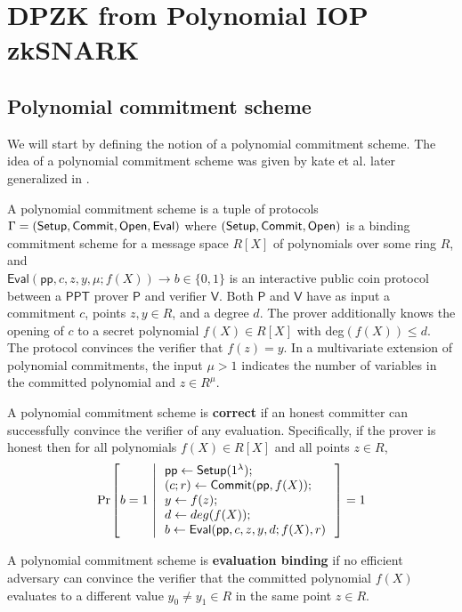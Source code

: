 \documentclass[runningheads]{llncs}
\def\commit{\mathsf{Commit}}
\def\open{\mathsf{Open}}
\def\eval{\mathsf{Eval}}
\def\pp{\mathsf{pp}}
\def\bitset{\{0,1\}}
\def\ppt{\mathsf{PPT}}
\def\prover{\mathsf{P}}
\def\verifier{\mathsf{V}}
\begin{document}
\section{DPZK from Polynomial IOP zkSNARK}
\subsection{Polynomial commitment scheme}
We will start by defining the notion of a polynomial commitment scheme. The idea of a polynomial commitment scheme was given by kate et al. \cite{KGZ10} later generalized in \cite{DARK19}.
\begin{definition}\label{defn:polycomm}
A polynomial commitment scheme is a tuple of protocols $\Gamma =(\setup, \commit, \open, \eval)$ where $(\setup, \commit, \open)$ is a binding commitment scheme for a message space $R[X]$ of polynomials over some ring $R$, and 
\\ $\eval(\pp, c, z, y, \mu; f(X)) \rightarrow b \in \bitset$ is an interactive public coin protocol between a $\ppt$ prover $\prover$ and verifier $\verifier$. Both $\prover$ and $\verifier$ have as input a commitment $c$, points $z,y\in R$, and a degree $d$. The prover additionally knows the opening of $c$ to a secret polynomial $f(X)\in R[X]$ with deg$(f(X))\leq d$. The protocol convinces the verifier that $f(z)=y$. In a multivariate extension of polynomial commitments, the input $\mu > 1$ indicates the number of variables in the committed polynomial and $z\in R^{\mu}$.  
\end{definition}

A polynomial commitment scheme is \textbf{correct} if an honest committer can successfully convince the verifier of any evaluation. Specifically, if the prover is honest then for all polynomials $f(X) \in R[X]$ and all points $z\in R$,
\begin{align*}
\condprob{b=1}{
	\begin{array}{l}
	\pp \leftarrow \setup (\secparam); \\
	(c;r)\leftarrow\commit(\pp, f(X)); \\
	y \leftarrow f(z);\\
	d \leftarrow deg(f(X));\\
	b\leftarrow \eval(\pp, c,z,y,d;f(X),r)
	\end{array}
} = 1
\end{align*}

A polynomial commitment scheme is \textbf{evaluation binding} if no efficient adversary can convince the verifier that the committed polynomial $f(X)$ evaluates to a different value $y_0 \neq y_1 \in R$ in the same point $z\in R$.
\end{document}
